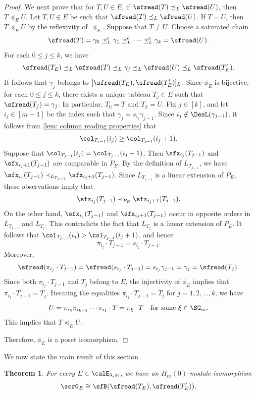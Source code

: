 \documentclass[12pt, reqno]{amsart}
\numberwithin{equation}{section}
\numberwithin{figure}{section}
\numberwithin{table}{section}
\newtheorem{theorem}{Theorem}[section]
\theoremstyle{definition}
\begin{document}
\begin{proof}
We next prove that for $T,U \in E$, if $\sfread(T)\preceq_L\sfread(U)$, then $T\preceq_E U$.
Let $T,U \in E$ be such that $\sfread(T)\preceq_L\sfread(U)$.
If $T=U$, then $T\preceq_E U$ by the reflexivity of $\preceq_E$.
Suppose that $T\ne U$.
Choose a saturated chain
\[
\sfread(T)=\gamma_0\preceq_L^c\gamma_1\preceq_L^c\cdots\preceq_L^c\gamma_k=\sfread(U).
\]
For each $0 \le j \le k$, we have
\[
\sfread(T_E)\preceq_L\sfread(T)\preceq_L\gamma_j
\preceq_L\sfread(U)\preceq_L\sfread(T'_E).
\]
It follows that $\gamma_j$ belongs to $[\sfread(T_E),\sfread(T'_E)]_L$.
Since $\phi_E$ is bijective, for each $0 \le j \le k$, there exists a unique tableau $T_j \in E$ such that $\sfread(T_j)=\gamma_j$.
In particular, $T_0=T$ and $T_k=U$.
Fix $j \in [k]$, and let $i_j \in [m-1]$ be the index such that $\gamma_j = s_{i_j}\gamma_{j-1}$.
Since $i_j \notin \DesL(\gamma_{j-1})$, it follows from \cref{lem: column reading properties} that
\[
\col_{T_{j-1}}(i_j)\ge\col_{T_{j-1}}(i_j+1).
\]
Suppose that $\col_{T_{j-1}}(i_j) = \col_{T_{j-1}}(i_j+1)$.
Then $\sfx_{i_j}(T_{j-1})$ and $\sfx_{i_j+1}(T_{j-1})$ are comparable in $P_E$.
By the definition of $L_{T_{j-1}}$, we have
$\sfx_{i_j}(T_{j-1}) \prec_{L_{T_{j-1}}} \sfx_{i_j+1}(T_{j-1})$.
Since $L_{T_{j-1}}$ is a linear extension of $P_E$, these observations imply that
\[
\sfx_{i_j}(T_{j-1})\prec_{P_E}\sfx_{i_j+1}(T_{j-1}).
\] 
On the other hand, $\sfx_{i_j}(T_{j-1})$ and $\sfx_{i_j+1}(T_{j-1})$ occur in opposite orders in $L_{T_{j-1}}$ and $L_{T_j}$.
This contradicts the fact that $L_{T_j}$ is a linear extension of $P_E$.
It follows that $\col_{T_{j-1}}(i_j)>\col_{T_{j-1}}(i_j+1)$, and hence
\[
\pi_{i_j}\cdot T_{j-1}=s_{i_j}\cdot T_{j-1}.
\]
Moreover,
\[
\sfread(\pi_{i_j} \cdot T_{j-1})
= \sfread(s_{i_j}\cdot T_{j-1})
= s_{i_j}\gamma_{j-1}
= \gamma_j
= \sfread(T_j).
\]
Since both $\pi_{i_j}\cdot T_{j-1}$ and $T_j$ belong to $E$, the injectivity of $\phi_E$ implies that $\pi_{i_j}\cdot T_{j-1}=T_j$.
Iterating the equalities $\pi_{i_j}\cdot T_{j-1}=T_j$ for $j=1,2,\ldots,k$, we have
\[
U=\pi_{i_k}\pi_{i_{k-1}}\cdots\pi_{i_1}\cdot T
=\pi_\xi\cdot T \quad \text{for some } \xi \in \SG_m.
\]
This implies that $T\preceq_E U$.

Therefore, $\phi_E$ is a poset isomorphism.
\end{proof}

We now state the main result of this section.

\begin{theorem}\label{thm: component interval module}
For every $E \in \calE_{\lambda,m}$, we have an $H_m(0)$-module isomorphism
\[
\scrG_E\cong\sfB(\sfread(T_E),\sfread(T'_E)).
\]
\end{theorem}
\end{document}

